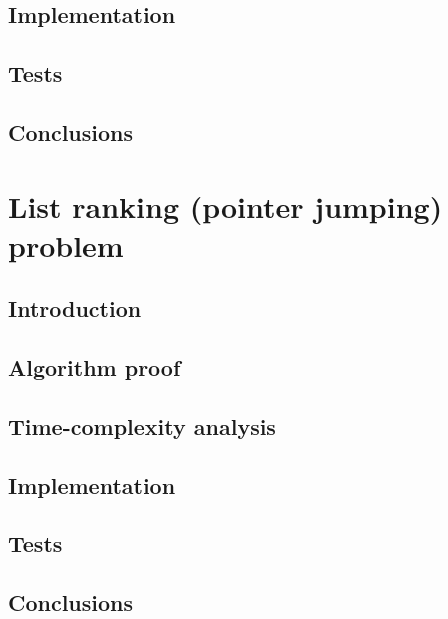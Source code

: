 \documentclass[a4paper,10pt,notitlepage]{article}
\begin{document}
\subsection{Implementation}

\subsection{Tests}

\subsection{Conclusions}


\section{List ranking (pointer jumping) problem}

\subsection{Introduction}

\subsection{Algorithm proof}

\subsection{Time-complexity analysis}

\subsection{Implementation}

\subsection{Tests}

\subsection{Conclusions}
\end{document}
